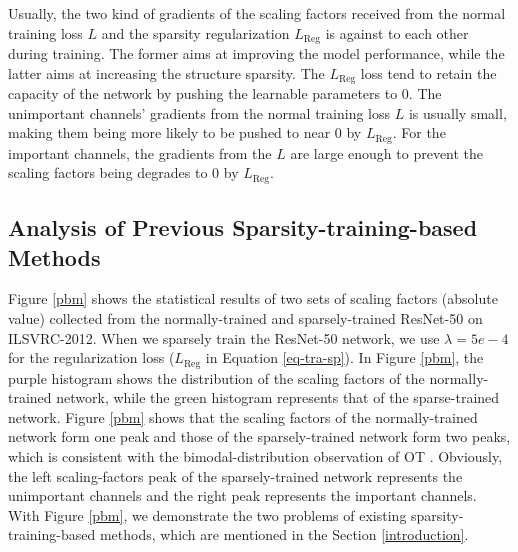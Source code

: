 \documentclass[review]{cvpr}
\begin{document}
Usually, the two kind of gradients of the scaling factors received from the normal training loss $L$ and the sparsity regularization $L_\text{Reg}$ is against to each other during training. The former aims at improving the model performance, while the latter aims at increasing the structure sparsity. The $L_\text{Reg}$ loss tend to retain the capacity of the network by pushing the learnable parameters to 0. The unimportant channels' gradients from the normal training loss $L$ is usually small, making them being more likely to be pushed to near 0 by $L_\text{Reg}$. For the important channels, the gradients from the $L$ are large enough to prevent the scaling factors being degrades to 0 by $L_\text{Reg}$. 

 
\subsection{ Analysis of Previous Sparsity-training-based Methods }\label{Analysisoftraditionalsp}

Figure \ref{pbm} shows the statistical results of two sets of scaling factors (absolute value) collected from the normally-trained and sparsely-trained ResNet-50 \cite{he2016deep} on ILSVRC-2012. When we sparsely train the ResNet-50 network, we use $\lambda=5e-4$ for the regularization loss ($L_\text{Reg}$ in Equation \ref{eq-tra-sp}). In Figure \ref{pbm}, the purple histogram shows the distribution of the scaling factors of the  normally-trained network, while the green histogram represents that of the sparse-trained network. Figure \ref{pbm} shows that the scaling factors of the normally-trained network form one peak and those of the sparsely-trained network form two peaks, which is consistent with the bimodal-distribution observation of OT \cite{ye2020channel}.
Obviously, the left scaling-factors peak of the sparsely-trained network represents the unimportant channels and the right peak represents the important channels. 
With Figure \ref{pbm}, we demonstrate the two problems of existing sparsity-training-based methods, which are mentioned in the Section \ref{introduction}. 
\end{document}
